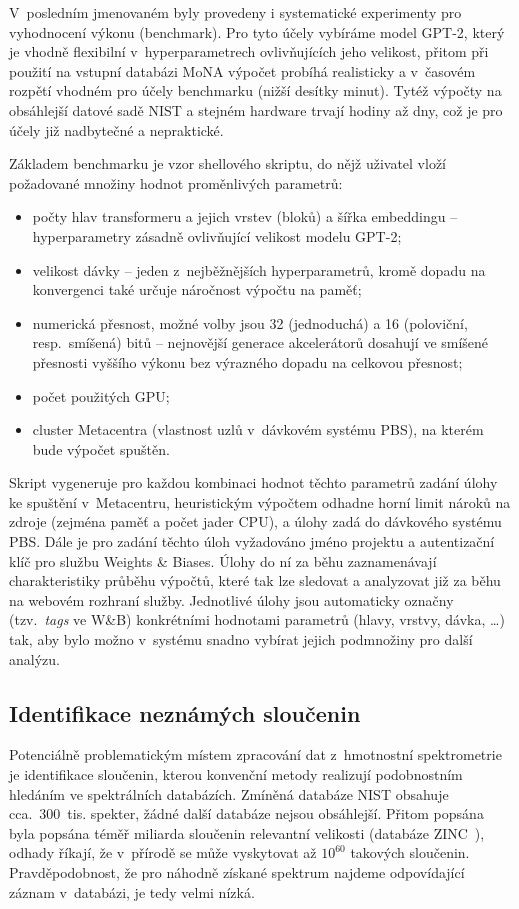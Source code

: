 \documentclass[a4paper,11pt]{article}
\begin{document}
V~posledním jmenovaném byly provedeny i systematické experimenty pro vyhodnocení výkonu (benchmark).
Pro tyto účely vybíráme model GPT-2, který je vhodně flexibilní v~hyperparametrech ovlivňujících jeho velikost,
přitom při použití na vstupní databázi MoNA výpočet probíhá realisticky a v~časovém rozpětí vhodném
pro účely benchmarku (nižší desítky minut).
Tytéž výpočty na obsáhlejší datové sadě NIST a stejném hardware trvají hodiny až dny, což je pro účely
již nadbytečné a nepraktické.

Základem benchmarku je vzor shellového skriptu, do nějž uživatel vloží požadované množiny hodnot proměnlivých parametrů: 
\begin{itemize}
\item počty hlav transformeru a jejich vrstev (bloků) a šířka embeddingu -- hyperparametry zásadně ovlivňující velikost modelu GPT-2;
\item velikost dávky -- jeden z~nejběžnějších hyperparametrů, kromě dopadu na konvergenci také určuje náročnost výpočtu na 
paměť;
\item numerická přesnost, možné volby jsou 32 (jednoduchá) a 16 (poloviční,
resp.\ smíšená) bitů -- nejnovější generace akcelerátorů dosahují ve smíšené přesnosti
vyššího výkonu bez výrazného dopadu na celkovou přesnost;
\item počet použitých GPU;
\item cluster Metacentra (vlastnost uzlů v~dávkovém systému PBS), na kterém bude výpočet spuštěn.
\end{itemize} 
Skript vygeneruje pro každou kombinaci hodnot těchto parametrů zadání úlohy ke spuštění v~Metacentru,
heuristickým výpočtem odhadne horní limit nároků na zdroje (zejména paměť a počet jader CPU), a úlohy
zadá do dávkového systému PBS.
Dále je pro zadání těchto úloh vyžadováno jméno projektu a autentizační klíč pro službu Weights \& Biases.
Úlohy do ní za běhu zaznamenávají charakteristiky průběhu výpočtů, které tak lze sledovat a analyzovat
již za běhu na webovém rozhraní služby.
Jednotlivé úlohy jsou automaticky označny (tzv.~\emph{tags} ve W\&B) konkrétními hodnotami parametrů
(hlavy, vrstvy, dávka, \dots) tak, aby bylo možno v~systému snadno vybírat jejich podmnožiny
pro další analýzu.

\subsection{Identifikace neznámých sloučenin}
Potenciálně problematickým místem zpracování dat z~hmotnostní spektrometrie je identifikace sloučenin,
kterou konvenční metody realizují podobnostním hledáním ve spektrálních databázích.
Zmíněná databáze NIST obsahuje cca.\ 300~tis. spekter, žádné další databáze nejsou obsáhlejší.
Přitom popsána byla popsána téměř miliarda sloučenin relevantní velikosti (databáze ZINC~\cite{zinc}),
odhady říkají, že v~přírodě se může vyskytovat až $10^{60}$ takových sloučenin.
Pravděpodobnost, že pro náhodně získané spektrum najdeme odpovídající záznam v~databázi, je tedy velmi nízká.
\end{document}
